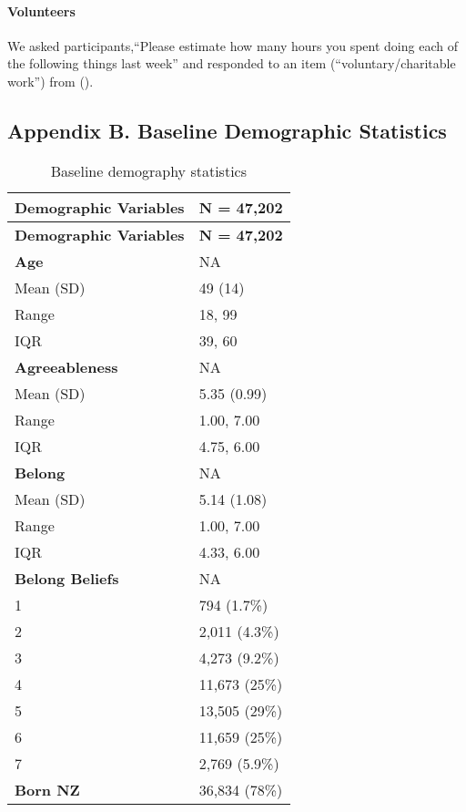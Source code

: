 \documentclass[
  singlecolumn]{article}
\let\oldparagraph\paragraph
\renewcommand{\paragraph}[1]{\oldparagraph{#1}\mbox{}}
\begin{document}
\paragraph{Volunteers}\label{volunteers}

We asked participants,``Please estimate how many hours you spent doing
each of the following things last week'' and responded to an item
(``voluntary/charitable work'') from ().

\subsection{Appendix B. Baseline Demographic
Statistics}\label{appendix-demographics}

\begin{longtable}[]{@{}ll@{}}
\caption{Baseline demography
statistics}\label{tbl-table-demography}\tabularnewline
\toprule\noalign{}
\textbf{Demographic Variables} & \textbf{N = 47,202} \\
\midrule\noalign{}
\endfirsthead
\toprule\noalign{}
\textbf{Demographic Variables} & \textbf{N = 47,202} \\
\midrule\noalign{}
\endhead
\bottomrule\noalign{}
\endlastfoot
\textbf{Age} & NA \\
Mean (SD) & 49 (14) \\
Range & 18, 99 \\
IQR & 39, 60 \\
\textbf{Agreeableness} & NA \\
Mean (SD) & 5.35 (0.99) \\
Range & 1.00, 7.00 \\
IQR & 4.75, 6.00 \\
\textbf{Belong} & NA \\
Mean (SD) & 5.14 (1.08) \\
Range & 1.00, 7.00 \\
IQR & 4.33, 6.00 \\
\textbf{Belong Beliefs} & NA \\
1 & 794 (1.7\%) \\
2 & 2,011 (4.3\%) \\
3 & 4,273 (9.2\%) \\
4 & 11,673 (25\%) \\
5 & 13,505 (29\%) \\
6 & 11,659 (25\%) \\
7 & 2,769 (5.9\%) \\
\textbf{Born NZ} & 36,834 (78\%) \\

\end{longtable}
\end{document}
